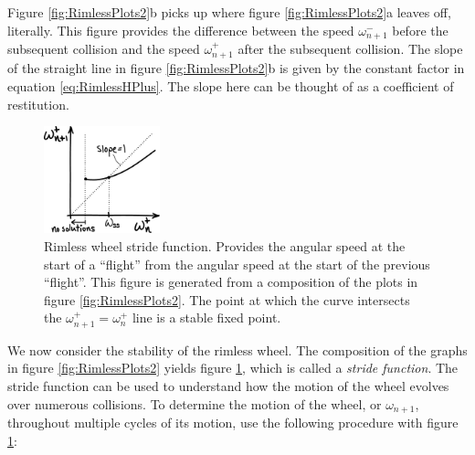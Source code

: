 Figure \ref{fig:RimlessPlots2}b picks up where figure \ref{fig:RimlessPlots2}a
leaves off, literally. This figure provides the difference between the speed
$\omega_{n+1}^{-}$ before the subsequent collision and the speed
$\omega_{n+1}^{+}$ after the subsequent collision.   The slope of the straight
line in figure \ref{fig:RimlessPlots2}b is given by the constant factor in
equation \ref{eq:RimlessHPlus}. The slope here can be thought of as a
coefficient of restitution.

\begin{figure}[h]		%
\begin{centering}
\includegraphics[width=0.3\textwidth]{Figures/RimlessStrideFunction}\par
\end{centering}
\caption[Plot: Rimless Wheel Stride Function]{Rimless wheel stride function. Provides the angular speed at the start of a ``flight'' from the angular speed at the start of the previous ``flight''. This figure is generated from a composition of the plots in figure \ref{fig:RimlessPlots2}. The point at which the curve intersects the $\omega_{n+1}^{+} = \omega_{n}^{+}$ line is a stable fixed point.}
\label{fig:RimlessStrideFunction}
\end{figure}
%

We now consider the stability of the rimless wheel. The composition of the
graphs in figure \ref{fig:RimlessPlots2} yields figure
\ref{fig:RimlessStrideFunction}, which is called a \emph{stride
function}. The stride function can be used to understand
how the motion of the wheel evolves over numerous collisions. To determine the
motion of the wheel, or $\omega_{n+1}$, throughout multiple cycles of its
motion, use the following procedure with figure
\ref{fig:RimlessStrideFunction}:

